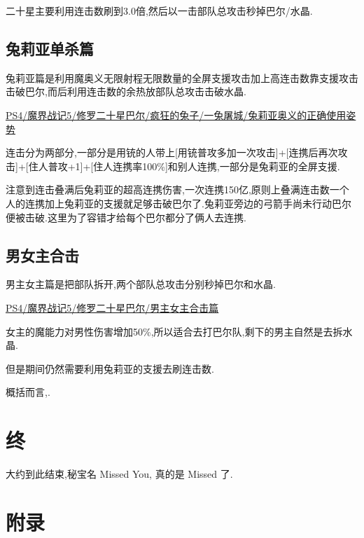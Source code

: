 	二十星主要利用连击数刷到3.0倍,然后以一击部队总攻击秒掉巴尔/水晶.

	\subsection{兔莉亚单杀篇}

	兔莉亚篇是利用魔奥义无限射程无限数量的全屏支援攻击加上高连击数靠支援攻击击破巴尔,而后利用连击数的余热放部队总攻击击破水晶.

	\href{http://www.bilibili.com/video/av2989748/}{PS4/魔界战记5/修罗二十星巴尔/疯狂的兔子/一兔屠城/兔莉亚奥义的正确使用姿势}


	连击分为两部分,一部分是用铳的人带上[用铳普攻多加一次攻击]+[连携后再次攻击]+[住人普攻+1]+[住人连携率100\%]和别人连携,一部分是兔莉亚的全屏支援.

	注意到连击叠满后兔莉亚的超高连携伤害,一次连携150亿,原则上叠满连击数一个人的连携加上兔莉亚的支援就足够击破巴尔了.兔莉亚旁边的弓箭手尚未行动巴尔便被击破.这里为了容错才给每个巴尔都分了俩人去连携.

	\subsection{男女主合击}
	男主女主篇是把部队拆开,两个部队总攻击分别秒掉巴尔和水晶.
	
	\href{http://www.bilibili.com/video/av2995573/}{PS4/魔界战记5/修罗二十星巴尔/男主女主合击篇}

	女主的魔能力对男性伤害增加50\%,所以适合去打巴尔队,剩下的男主自然是去拆水晶.

	但是期间仍然需要利用兔莉亚的支援去刷连击数.

	概括而言,{\color{red}{二十星是利用连击+部队总攻击}}.


	\newpage
	\section{终}
	大约到此结束,秘宝名 Missed You, 真的是 Missed 了.

	\newpage
	\section*{附录}

